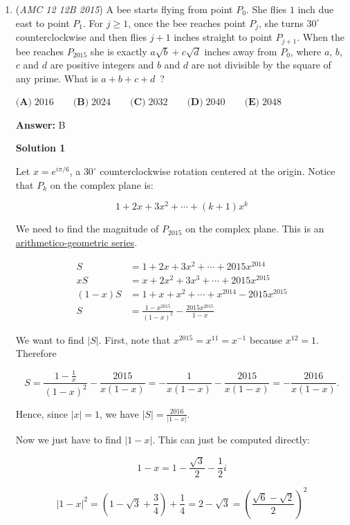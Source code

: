 \begin{enumerate}
 


	\item (\textit{AMC 12 12B 2015}) A bee starts flying from point $P_0$. She flies $1$ inch due east to point $P_1$. For $j \ge 1$, once the bee reaches point $P_j$, she turns $30^{\circ}$ counterclockwise and then flies $j+1$ inches straight to point $P_{j+1}$. When the bee reaches $P_{2015}$ she is exactly $a \sqrt{b} + c \sqrt{d}$ inches away from $P_0$, where $a$, $b$, $c$ and $d$ are positive integers and $b$ and $d$ are not divisible by the square of any prime. What is $a+b+c+d$ ?


 $\textbf{(A)}\; 2016 \qquad\textbf{(B)}\; 2024 \qquad\textbf{(C)}\; 2032 \qquad\textbf{(D)}\; 2040 \qquad\textbf{(E)}\; 2048$

 \textbf{Answer: }B



\textbf{Solution 1}

Let $x=e^{i\pi/6}$, a $30^\circ$ counterclockwise rotation centered at the origin. Notice that $P_k$ on the complex plane is:

 
 \[1+2x+3x^2+\cdots+(k+1)x^k\]

 We need to find the magnitude of $P_{2015}$ on the complex plane. This is an \href{https://artofproblemsolving.com/wiki/index.php?title=Arithmetico-geometric\_series}{arithmetico-geometric series}. 

 
 \begin{align*} S &=1+2x+3x^2+\cdots+2015x^{2014} \\ xS &=x+2x^2+3x^3+\cdots+2015x^{2015} \\ (1-x)S &=1+x+x^2+\cdots+x^{2014}-2015x^{2015} \\ S &= \frac{1-x^{2015}}{(1-x)^2}-\frac{2015x^{2015}}{1-x} \end{align*}


 We want to find $|S|$. First, note that $x^{2015}=x^{11}=x^{-1}$ because $x^{12}=1$. Therefore

 
 \[S =\frac{1-\frac{1}{x}}{(1-x)^2}-\frac{2015}{x(1-x)}=-\frac{1}{x(1-x)}-\frac{2015}{x(1-x)}=-\frac{2016}{x(1-x)}.\]

 Hence, since $|x|=1$, we have $|S| = \frac{2016}{|1-x|}.$

 Now we just have to find $|1-x|$. This can just be computed directly:

 
 \[1-x=1-\frac{\sqrt{3}}{2}-\frac{1}{2}i\]

 \[|1-x|^2=\left(1-\sqrt{3}+\frac{3}{4}\right)+\frac{1}{4}=2-\sqrt{3}={\left(\frac{\sqrt{6}-\sqrt{2}}{2}\right)}^2\]


\end{enumerate}
